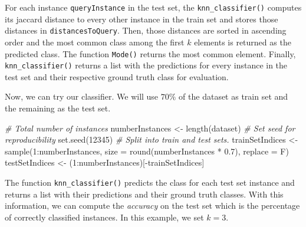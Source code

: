\documentclass[
  11pt,
]{krantz}
\newenvironment{Shaded}{\begin{snugshade}}{\end{snugshade}}
\newcommand{\AttributeTok}[1]{\textcolor[rgb]{0.61,0.61,0.61}{#1}}
\newcommand{\CommentTok}[1]{\textcolor[rgb]{0.37,0.37,0.37}{\textit{#1}}}
\newcommand{\DecValTok}[1]{\textcolor[rgb]{0.06,0.06,0.06}{#1}}
\newcommand{\FloatTok}[1]{\textcolor[rgb]{0.06,0.06,0.06}{#1}}
\newcommand{\FunctionTok}[1]{\textcolor[rgb]{0,0,0}{#1}}
\newcommand{\NormalTok}[1]{#1}
\newcommand{\OtherTok}[1]{\textcolor[rgb]{0.37,0.37,0.37}{#1}}
\newcommand{\SpecialCharTok}[1]{\textcolor[rgb]{0,0,0}{#1}}
\begin{document}
For each instance \texttt{queryInstance} in the test set, the \texttt{knn\_classifier()} computes its jaccard distance to every other instance in the train set and stores those distances in \texttt{distancesToQuery}. Then, those distances are sorted in ascending order and the most common class among the first \(k\) elements is returned as the predicted class. The function \texttt{Mode()} returns the most common element. Finally, \texttt{knn\_classifier()} returns a list with the predictions for every instance in the test set and their respective ground truth class for evaluation.

Now, we can try our classifier. We will use \(70\%\) of the dataset as train set and the remaining as the test set.

\begin{Shaded}
\begin{Highlighting}[]
\CommentTok{\# Total number of instances}
\NormalTok{numberInstances }\OtherTok{\textless{}{-}} \FunctionTok{length}\NormalTok{(dataset)}
\CommentTok{\# Set seed for reproducibility}
\FunctionTok{set.seed}\NormalTok{(}\DecValTok{12345}\NormalTok{)}
\CommentTok{\# Split into train and test sets.}
\NormalTok{trainSetIndices }\OtherTok{\textless{}{-}} \FunctionTok{sample}\NormalTok{(}\DecValTok{1}\SpecialCharTok{:}\NormalTok{numberInstances,}
                          \AttributeTok{size =} \FunctionTok{round}\NormalTok{(numberInstances }\SpecialCharTok{*} \FloatTok{0.7}\NormalTok{),}
                          \AttributeTok{replace =}\NormalTok{ F)}
\NormalTok{testSetIndices }\OtherTok{\textless{}{-}}\NormalTok{ (}\DecValTok{1}\SpecialCharTok{:}\NormalTok{numberInstances)[}\SpecialCharTok{{-}}\NormalTok{trainSetIndices]}
\end{Highlighting}
\end{Shaded}

The function \texttt{knn\_classifier()} predicts the class for each test set instance and returns a list with their predictions and their ground truth classes. With this information, we can compute the \emph{accuracy} on the test set which is the percentage of correctly classified instances. In this example, we set \(k=3\).

\begin{Shaded}
\end{Shaded}
\end{document}
